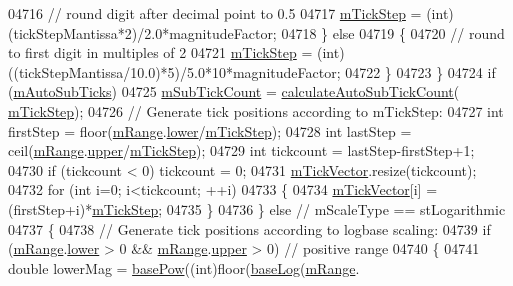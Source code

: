 \begin{DoxyCode}
04716         \textcolor{comment}{// round digit after decimal point to 0.5}
04717         \hyperlink{a00025_a4fe96830fc5a2711e20fe5edccfe2ed3}{mTickStep} = (int)(tickStepMantissa*2)/2.0*magnitudeFactor;
04718       \} \textcolor{keywordflow}{else}
04719       \{
04720         \textcolor{comment}{// round to first digit in multiples of 2}
04721         \hyperlink{a00025_a4fe96830fc5a2711e20fe5edccfe2ed3}{mTickStep} = (int)((tickStepMantissa/10.0)*5)/5.0*10*magnitudeFactor;
04722       \}
04723     \}
04724     \textcolor{keywordflow}{if} (\hyperlink{a00025_aaae980b0d193d959674e314dbb6c2c3b}{mAutoSubTicks})
04725       \hyperlink{a00025_ad70198e6ae2801fc409bc3caec707da9}{mSubTickCount} = \hyperlink{a00025_a3c5c045019fcdc0843a3e064eda7478a}{calculateAutoSubTickCount}(
      \hyperlink{a00025_a4fe96830fc5a2711e20fe5edccfe2ed3}{mTickStep});
04726     \textcolor{comment}{// Generate tick positions according to mTickStep:}
04727     \textcolor{keywordtype}{int} firstStep = floor(\hyperlink{a00025_a1ee36773c49062d751560e11f90845f7}{mRange}.\hyperlink{a00049_aa3aca3edb14f7ca0c85d912647b91745}{lower}/\hyperlink{a00025_a4fe96830fc5a2711e20fe5edccfe2ed3}{mTickStep});
04728     \textcolor{keywordtype}{int} lastStep = ceil(\hyperlink{a00025_a1ee36773c49062d751560e11f90845f7}{mRange}.\hyperlink{a00049_ae44eb3aafe1d0e2ed34b499b6d2e074f}{upper}/\hyperlink{a00025_a4fe96830fc5a2711e20fe5edccfe2ed3}{mTickStep});
04729     \textcolor{keywordtype}{int} tickcount = lastStep-firstStep+1;
04730     \textcolor{keywordflow}{if} (tickcount < 0) tickcount = 0;
04731     \hyperlink{a00025_aae0f9b9973b85be601200f00f5825087}{mTickVector}.resize(tickcount);
04732     \textcolor{keywordflow}{for} (\textcolor{keywordtype}{int} i=0; i<tickcount; ++i)
04733     \{
04734       \hyperlink{a00025_aae0f9b9973b85be601200f00f5825087}{mTickVector}[i] = (firstStep+i)*\hyperlink{a00025_a4fe96830fc5a2711e20fe5edccfe2ed3}{mTickStep};
04735     \}
04736   \} \textcolor{keywordflow}{else} \textcolor{comment}{// mScaleType == stLogarithmic}
04737   \{
04738     \textcolor{comment}{// Generate tick positions according to logbase scaling:}
04739     \textcolor{keywordflow}{if} (\hyperlink{a00025_a1ee36773c49062d751560e11f90845f7}{mRange}.\hyperlink{a00049_aa3aca3edb14f7ca0c85d912647b91745}{lower} > 0 && \hyperlink{a00025_a1ee36773c49062d751560e11f90845f7}{mRange}.\hyperlink{a00049_ae44eb3aafe1d0e2ed34b499b6d2e074f}{upper} > 0) \textcolor{comment}{// positive range}
04740     \{
04741       \textcolor{keywordtype}{double} lowerMag = \hyperlink{a00025_a97d69f021a05126fcb978d0aefea47b8}{basePow}((\textcolor{keywordtype}{int})floor(\hyperlink{a00025_a1385765db2419ee5fb5505a6cf9130fb}{baseLog}(\hyperlink{a00025_a1ee36773c49062d751560e11f90845f7}{mRange}.

\end{DoxyCode}
